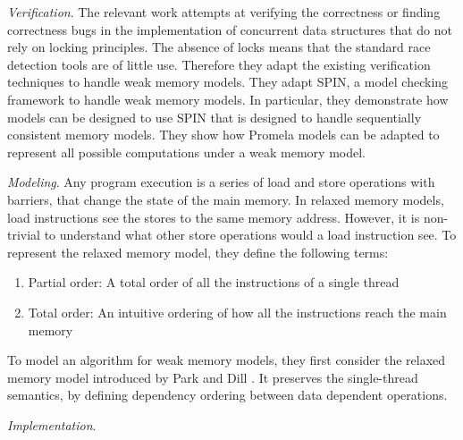 \emph{Verification}. The relevant work attempts at verifying the correctness or finding correctness bugs
in the implementation of concurrent data structures that do not rely on locking principles. The absence
of locks means that the standard race detection tools are of little use. Therefore they adapt the
existing verification techniques to handle weak memory models. They adapt SPIN, a model checking framework
to handle weak memory models. In particular, they demonstrate how models can be designed to use SPIN that
is designed to handle sequentially consistent  memory models. They show how Promela models can be adapted
to represent all possible computations under a weak memory model.

\emph{Modeling}. Any program execution is a series of load and store operations with barriers, that change
the state of the main memory. In relaxed memory models, load instructions see the stores to the same memory
address. However, it is non-trivial to understand what other store operations would a load instruction see.
To represent the relaxed memory model, they define the following terms:
\begin{enumerate}
	\item Partial order: A total order of all the instructions of a single thread
	\item Total order: An intuitive ordering of how all the instructions reach the main memory
\end{enumerate}
To model an algorithm for weak memory models, they first consider the relaxed memory model introduced
by Park and Dill \cite{}. It preserves the single-thread semantics, by defining dependency ordering between
data dependent operations.

\emph{Implementation}.
